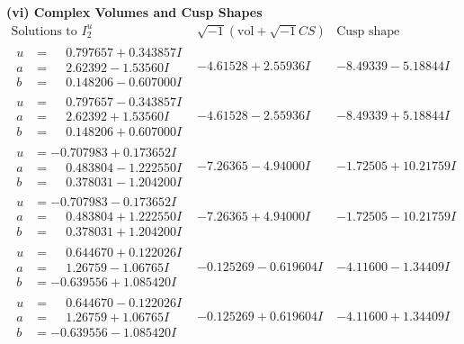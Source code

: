 \documentclass[1p]{elsarticle_modified}
\theoremstyle{definition}
\newcommand{\I}{\sqrt{-1}}
\begin{document}
\newpage\flushleft \textbf{(vi) Complex Volumes and Cusp Shapes}
$$\begin{array}{c|c|c}  
\text{Solutions to }I^u_{2}& \I (\text{vol} + \sqrt{-1}CS) & \text{Cusp shape}\\
 \hline 
\begin{aligned}
u &= \phantom{-}0.797657 + 0.343857 I \\
a &= \phantom{-}2.62392 - 1.53560 I \\
b &= \phantom{-}0.148206 - 0.607000 I\end{aligned}
 & -4.61528 + 2.55936 I & -8.49339 - 5.18844 I \\ \hline\begin{aligned}
u &= \phantom{-}0.797657 - 0.343857 I \\
a &= \phantom{-}2.62392 + 1.53560 I \\
b &= \phantom{-}0.148206 + 0.607000 I\end{aligned}
 & -4.61528 - 2.55936 I & -8.49339 + 5.18844 I \\ \hline\begin{aligned}
u &= -0.707983 + 0.173652 I \\
a &= \phantom{-}0.483804 - 1.222550 I \\
b &= \phantom{-}0.378031 - 1.204200 I\end{aligned}
 & -7.26365 - 4.94000 I & -1.72505 + 10.21759 I \\ \hline\begin{aligned}
u &= -0.707983 - 0.173652 I \\
a &= \phantom{-}0.483804 + 1.222550 I \\
b &= \phantom{-}0.378031 + 1.204200 I\end{aligned}
 & -7.26365 + 4.94000 I & -1.72505 - 10.21759 I \\ \hline\begin{aligned}
u &= \phantom{-}0.644670 + 0.122026 I \\
a &= \phantom{-}1.26759 - 1.06765 I \\
b &= -0.639556 + 1.085420 I\end{aligned}
 & -0.125269 - 0.619604 I & -4.11600 - 1.34409 I \\ \hline\begin{aligned}
u &= \phantom{-}0.644670 - 0.122026 I \\
a &= \phantom{-}1.26759 + 1.06765 I \\
b &= -0.639556 - 1.085420 I\end{aligned}
 & -0.125269 + 0.619604 I & -4.11600 + 1.34409 I \\ \hline\begin{aligned}

\end{aligned}
\end{array}$$
\end{document}
